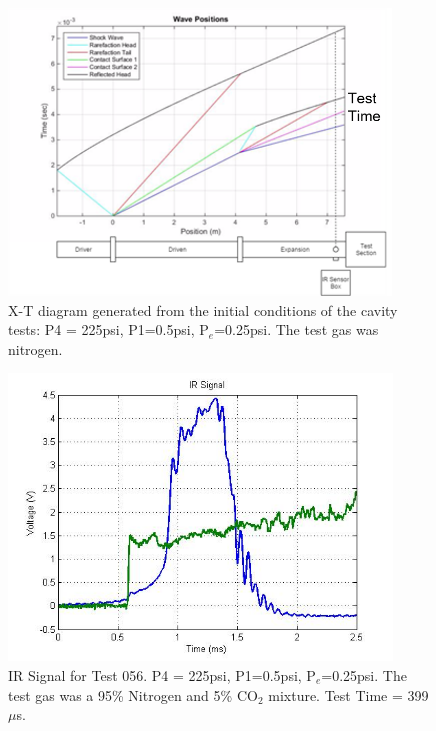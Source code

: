 \begin{figure}
\centering
\includegraphics[height = 3in]{Figures/XTDiag.png}
\caption[X-T Diagram of Cavity Tests]{X-T diagram generated from the initial conditions of the cavity tests: P4 = 225psi, P1=0.5psi, P$_e$=0.25psi. The test gas was nitrogen.}
\label{fig:XT}
\end{figure}

\begin{figure}
\centering
\includegraphics[height = 3in]{Figures/CO2-2.jpg}
\caption[IR Signal for Test 046]{IR Signal for Test 056. P4 = 225psi, P1=0.5psi, P$_e$=0.25psi. The test gas was a 95\% Nitrogen and 5\% CO$_2$ mixture. Test Time = 399 $\mu$s.}
\label{fig:IRTrace}
\end{figure}

